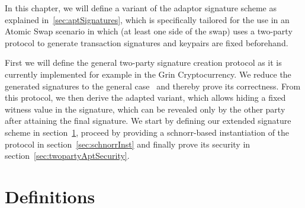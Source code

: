 In this chapter, we will define a variant of the adaptor signature scheme as explained in~\ref{sec:aptSignatures},
which is specifically tailored for the use in an Atomic Swap scenario in which (at least one side of the swap) uses a two-party protocol to generate transaction signatures and keypairs are fixed beforehand.

First we will define the general two-party signature creation protocol as it is currently implemented for example in the Grin Cryptocurrency.
We reduce the generated signatures to the general case~\cite{schnorr1989efficient} and thereby prove its correctness.
From this protocol, we then derive the adapted variant, which allows hiding a fixed witness
value in the signature, which can be revealed only by the other party after attaining the final signature.
We start by defining our extended signature scheme in section~\ref{sec:definitions}, proceed by providing a schnorr-based instantiation of the protocol in section~\ref{sec:schnorrInst} and finally prove its security in section~\ref{sec:twopartyAptSecurity}.

\section{Definitions}\label{sec:definitions}

